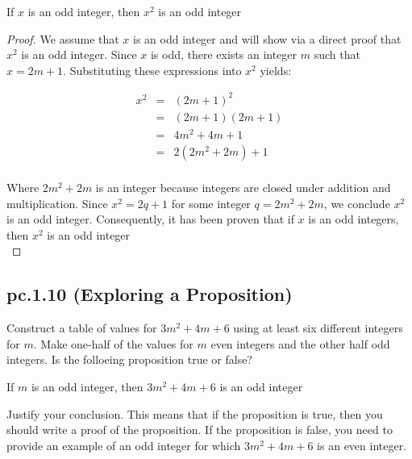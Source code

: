 \begin{tcolorbox}
\begin{theorem}
If $x$ is an odd integer, then $x^2$ is an odd integer
\end{theorem}
\end{tcolorbox}
\begin{proof}

We assume that $x$ is an odd integer and will show via a direct proof that $x^2$ is an odd integer. Since $x$ is odd, there exists an integer $m$ such that $x = 2m + 1$. Substituting these expressions into $x^2$ yields:

\begin{eqnarray*}
x^2 & = & (2m + 1)^2 \nonumber \\
& = & (2m + 1)(2m + 1) \nonumber \\
& = & 4m^2 + 4m + 1 \nonumber \\
& = & 2(2m^2 + 2m) + 1 \nonumber \\
\end{eqnarray*}

Where $2m^2 + 2m$ is an integer because integers are closed under addition and multiplication. Since $x^2 = 2q + 1$ for some integer $q = 2m^2 + 2m$, we conclude $x^2$ is an odd integer. Consequently, it has been proven that if $x$ is an odd integers, then $x^2$ is an odd integer \\

\end{proof}

\newpage
\subsection{pc.1.10 (Exploring a Proposition)}

Construct a table of values for $3m^2 + 4m + 6$ using at least six different integers for $m$. Make one-half of the values for $m$ even integers and the other half odd integers. Is the folloeing proposition true or false? \\

\begin{center}
If $m$ is an odd integer, then $3m^2 + 4m + 6$ is an odd integer
\end{center}

Justify your conclusion. This means that if the proposition is true, then you should write a proof of the proposition. If the proposition is false, you need to provide an example of an odd integer for which $3m^2 + 4m + 6$ is an even integer. \\


